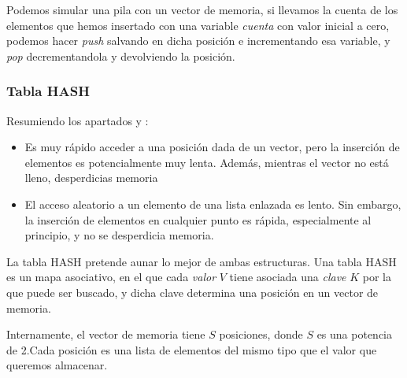 Podemos simular una pila con un vector de memoria, si llevamos la cuenta de los elementos que hemos insertado con una 
variable \emph{cuenta} con valor inicial a cero, podemos hacer \emph{push} salvando en dicha posición e incrementando 
esa variable, y \emph{pop} decrementandola y devolviendo la posición.

\subsubsection{Tabla HASH}
Resumiendo los apartados  y :
\begin{itemize}
 \item Es muy rápido acceder a una posición dada de un vector, pero la inserción de elementos es potencialmente muy 
lenta. Además, mientras el vector no está lleno, desperdicias memoria
 \item El acceso aleatorio a un elemento de una lista enlazada es lento. Sin embargo, la inserción de elementos en 
cualquier punto es rápida, especialmente al principio, y no se desperdicia memoria.
\end{itemize}

La tabla HASH pretende aunar lo mejor de ambas estructuras. Una tabla HASH es un mapa asociativo, en el que cada 
\emph{valor} $V$ tiene asociada una \emph{clave} $K$ por la que puede ser buscado, y dicha clave determina una posición 
en un vector de memoria.

Internamente, el vector de memoria tiene $S$ posiciones, donde $S$ es una potencia de 2.Cada posición es una lista de 
elementos del mismo tipo que el valor que queremos almacenar.

